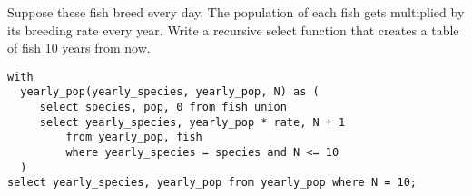 \begin{blocksection}
\question Suppose these fish breed every day. The population of each fish gets multiplied by its breeding rate every year. Write a recursive select function that creates a table of fish 10 years from now.

\begin{solution}[2in]
\begin{lstlisting}
with
  yearly_pop(yearly_species, yearly_pop, N) as (
     select species, pop, 0 from fish union
     select yearly_species, yearly_pop * rate, N + 1
         from yearly_pop, fish
         where yearly_species = species and N <= 10
  )
select yearly_species, yearly_pop from yearly_pop where N = 10;
\end{lstlisting}
\end{solution}
\end{blocksection}
